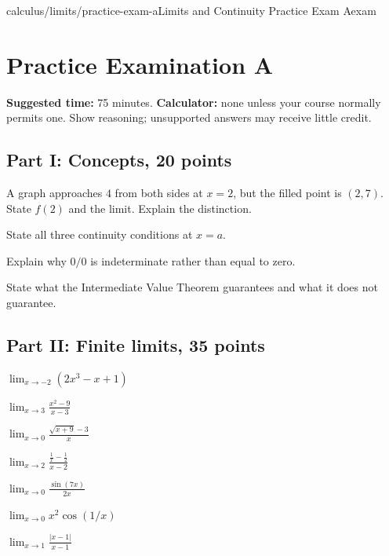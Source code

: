 \documentclass[11pt,openany]{book}
\theoremstyle{bgplain}
\begin{document}
\begin{webpage}{calculus/limits/practice-exam-a}{Limits and Continuity Practice Exam A}{exam}
\section{Practice Examination A}

\textbf{Suggested time:} 75 minutes. \textbf{Calculator:} none unless your course normally permits one. Show reasoning; unsupported answers may receive little credit.

\subsection*{Part I: Concepts, 20 points}
\begin{bgexercises}[label=\textbf{A\arabic*.}]
  \item A graph approaches \(4\) from both sides at \(x=2\), but the filled point is \((2,7)\). State \(f(2)\) and the limit. Explain the distinction.
  \item State all three continuity conditions at \(x=a\).
  \item Explain why \(0/0\) is indeterminate rather than equal to zero.
  \item State what the Intermediate Value Theorem guarantees and what it does not guarantee.
\end{bgexercises}

\subsection*{Part II: Finite limits, 35 points}
\begin{bgexercises}[label=\textbf{A\arabic*.},resume]
  \item \(\displaystyle\lim_{x\to-2}(2x^3-x+1)\)
  \item \(\displaystyle\lim_{x\to3}\frac{x^2-9}{x-3}\)
  \item \(\displaystyle\lim_{x\to0}\frac{\sqrt{x+9}-3}{x}\)
  \item \(\displaystyle\lim_{x\to2}\frac{\frac1x-\frac12}{x-2}\)
  \item \(\displaystyle\lim_{x\to0}\frac{\sin(7x)}{2x}\)
  \item \(\displaystyle\lim_{x\to0}x^2\cos(1/x)\)
  \item \(\displaystyle\lim_{x\to1}\frac{|x-1|}{x-1}\)
\end{bgexercises}


\end{webpage}
\end{document}
